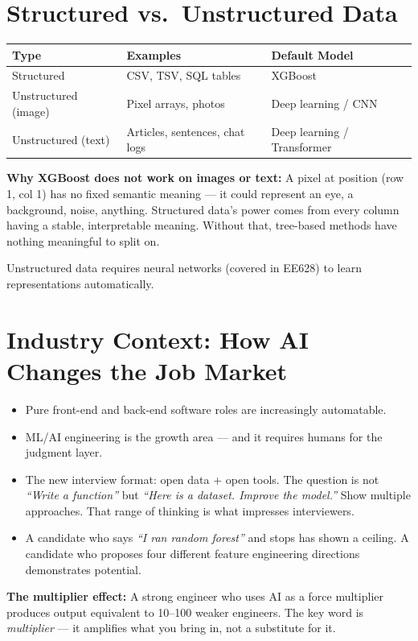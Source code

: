 \documentclass[11pt]{article}
\begin{document}
\newpage
\section{Structured vs.\ Unstructured Data}

\begin{center}
\begin{tabular}{@{}lll@{}}
\toprule
\textbf{Type}        & \textbf{Examples}                        & \textbf{Default Model}     \\
\midrule
Structured           & CSV, TSV, SQL tables                     & XGBoost                    \\
Unstructured (image) & Pixel arrays, photos                     & Deep learning / CNN        \\
Unstructured (text)  & Articles, sentences, chat logs           & Deep learning / Transformer \\
\bottomrule
\end{tabular}
\end{center}

\textbf{Why XGBoost does not work on images or text:}
A pixel at position (row 1, col 1) has no fixed semantic meaning --- it could represent an eye, a background, noise, anything. Structured data's power comes from every column having a stable, interpretable meaning. Without that, tree-based methods have nothing meaningful to split on.

Unstructured data requires neural networks (covered in EE628) to learn representations automatically.


\newpage
\section{Industry Context: How AI Changes the Job Market}

\begin{itemize}
    \item Pure front-end and back-end software roles are increasingly automatable.
    \item ML/AI engineering is the growth area --- and it requires humans for the judgment layer.
    \item The new interview format: open data + open tools. The question is not \textit{``Write a function''} but \textit{``Here is a dataset. Improve the model.''} Show multiple approaches. That range of thinking is what impresses interviewers.
    \item A candidate who says \textit{``I ran random forest''} and stops has shown a ceiling. A candidate who proposes four different feature engineering directions demonstrates potential.
\end{itemize}

\textbf{The multiplier effect:} A strong engineer who uses AI as a force multiplier produces output equivalent to 10--100 weaker engineers. The key word is \emph{multiplier} --- it amplifies what you bring in, not a substitute for it.
\end{document}
